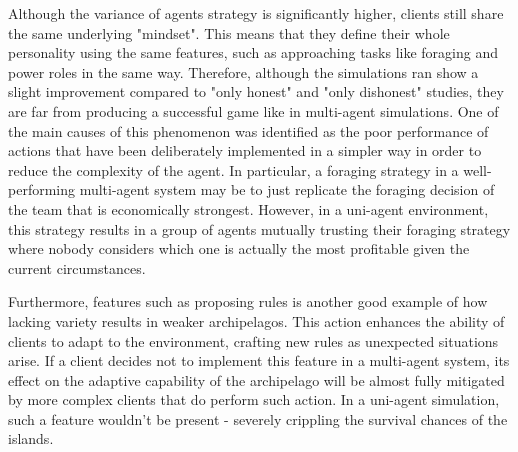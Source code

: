 Although the variance of agents strategy is significantly higher, clients still share the same underlying "mindset". This means that they define their whole personality using the same features, such as approaching tasks like foraging and power roles in the same way. Therefore, although the simulations ran show a slight improvement compared to "only honest" and "only dishonest" studies, they are far from producing a successful game like in multi-agent simulations. One of the main causes of this phenomenon was identified as the poor performance of actions that have been deliberately implemented in a simpler way in order to reduce the complexity of the agent. In particular, a foraging strategy in a well-performing multi-agent system may be to just replicate the foraging decision of the team that is economically strongest. However, in a uni-agent environment, this strategy  results in a group of agents mutually trusting their foraging strategy where nobody considers which one is actually the most profitable given the current circumstances.

Furthermore, features such as proposing rules is another good example of how lacking variety results in weaker archipelagos. This action enhances the ability of clients to adapt to the environment, crafting new rules as unexpected situations arise. If a client decides not to implement this feature in a multi-agent system, its effect on the adaptive capability of the archipelago will be almost fully mitigated by more complex clients that do perform such action. In a uni-agent simulation, such a feature wouldn't be present - severely crippling the survival chances of the islands.

